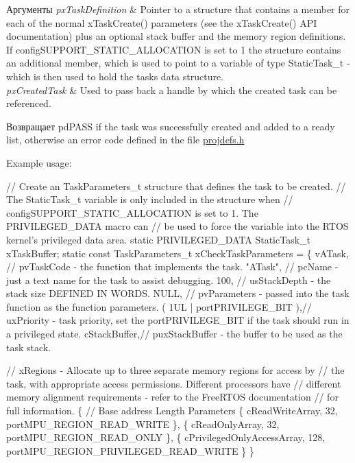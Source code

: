 \begin{DoxyParams}{Аргументы}
{\em px\+Task\+Definition} & Pointer to a structure that contains a member for each of the normal x\+Task\+Create() parameters (see the x\+Task\+Create() A\+PI documentation) plus an optional stack buffer and the memory region definitions. If config\+S\+U\+P\+P\+O\+R\+T\+\_\+\+S\+T\+A\+T\+I\+C\+\_\+\+A\+L\+L\+O\+C\+A\+T\+I\+ON is set to 1 the structure contains an additional member, which is used to point to a variable of type Static\+Task\+\_\+t -\/ which is then used to hold the task\textquotesingle{}s data structure.\\
\hline
{\em px\+Created\+Task} & Used to pass back a handle by which the created task can be referenced.\\
\hline
\end{DoxyParams}
\begin{DoxyReturn}{Возвращает}
pd\+P\+A\+SS if the task was successfully created and added to a ready list, otherwise an error code defined in the file \mbox{\hyperlink{projdefs_8h}{projdefs.\+h}}
\end{DoxyReturn}
Example usage\+: 
\begin{DoxyPre}
// Create an TaskParameters\_t structure that defines the task to be created.
// The StaticTask\_t variable is only included in the structure when
// configSUPPORT\_STATIC\_ALLOCATION is set to 1.  The PRIVILEGED\_DATA macro can
// be used to force the variable into the RTOS kernel's privileged data area.
static PRIVILEGED\_DATA StaticTask\_t xTaskBuffer;
static const TaskParameters\_t xCheckTaskParameters =
\{
    vATask,     // pvTaskCode - the function that implements the task.
    "ATask",    // pcName - just a text name for the task to assist debugging.
    100,        // usStackDepth - the stack size DEFINED IN WORDS.
    NULL,       // pvParameters - passed into the task function as the function parameters.
    ( 1UL | portPRIVILEGE\_BIT ),// uxPriority - task priority, set the portPRIVILEGE\_BIT if the task should run in a privileged state.
    cStackBuffer,// puxStackBuffer - the buffer to be used as the task stack.\end{DoxyPre}



\begin{DoxyPre}    // xRegions - Allocate up to three separate memory regions for access by
    // the task, with appropriate access permissions.  Different processors have
    // different memory alignment requirements - refer to the FreeRTOS documentation
    // for full information.
    \{
        // Base address                 Length  Parameters
        \{ cReadWriteArray,              32,     portMPU\_REGION\_READ\_WRITE \},
        \{ cReadOnlyArray,               32,     portMPU\_REGION\_READ\_ONLY \},
        \{ cPrivilegedOnlyAccessArray,   128,    portMPU\_REGION\_PRIVILEGED\_READ\_WRITE \}
    \}\end{DoxyPre}



